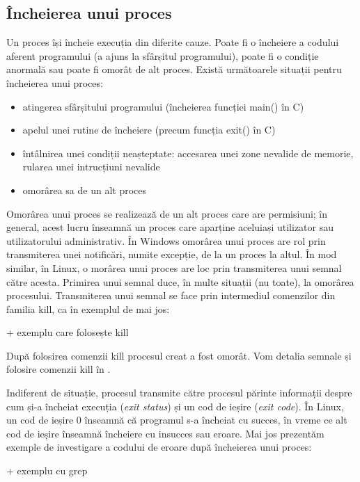 \subsection{Încheierea unui proces}
\label{sec:procese-operatii-incheiere}

Un proces își încheie execuția din diferite cauze. Poate fi o încheiere a
codului aferent programului (a ajuns la sfârșitul programului), poate fi o
condiție anormală sau poate fi omorât de alt proces. Există următoarele situații
pentru încheierea unui proces:

\begin{itemize}
	\item atingerea sfârșitului programului (încheierea funcției main() în
		C)
	\item apelul unei rutine de încheiere (precum funcția exit() în C)
	\item întâlnirea unei condiții neașteptate: accesarea unei zone nevalide
		de memorie, rularea unei intrucțiuni nevalide
	\item omorârea sa de un alt proces
\end{itemize}

Omorârea unui proces se realizează de un alt proces care are permisiuni; în
general, acest lucru înseamnă un proces care aparține aceluiași utilizator sau
utilizatorului administrativ. În Windows omorârea unui proces are rol prin
transmiterea unei notificări, numite excepție, de la un proces la altul. În mod
similar, în Linux, o morârea unui proces are loc prin transmiterea unui semnal
către acesta. Primirea unui semnal duce, în multe situații (nu toate), la
omorârea procesului. Transmiterea unui semnal se face prin intermediul
comenzilor din familia kill, ca în exemplul de mai jos:

+ exemplu care folosește kill

După folosirea comenzii kill procesul creat a fost omorât. Vom detalia semnale
și folosire comenzii kill în
.

Indiferent de situație, procesul transmite către procesul părinte informații
despre cum și-a încheiat execuția (\textit{exit status}) și un cod de ieșire
(\textit{exit code}). În Linux, un cod de ieșire 0 înseamnă că programul s-a
încheiat cu succes, în vreme ce alt cod de ieșire înseamnă încheiere cu insucces
sau eroare. Mai jos prezentăm exemple de investigare a codului de eroare după
încheierea unui proces:

+  exemplu cu grep

